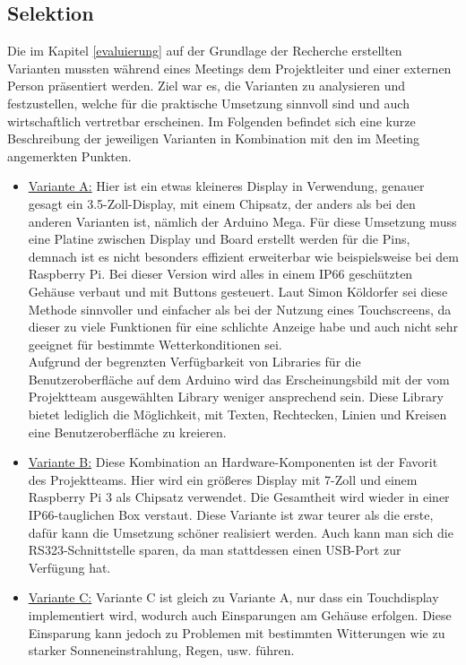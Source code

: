 \newpage
\subsection{Selektion} \label{selektion}
Die im Kapitel \ref{evaluierung} auf der Grundlage der Recherche erstellten Varianten mussten während eines Meetings dem Projektleiter und einer externen Person präsentiert werden. Ziel war es, die Varianten zu analysieren und festzustellen, welche für die praktische Umsetzung sinnvoll sind und auch wirtschaftlich vertretbar erscheinen. Im Folgenden befindet sich eine kurze Beschreibung der jeweiligen Varianten in Kombination mit den im Meeting angemerkten Punkten.

\begin{itemize}
	\item \underline{Variante A:} Hier ist ein etwas kleineres Display in Verwendung, genauer gesagt ein 3.5-Zoll-Display, mit einem Chipsatz, der anders als bei den anderen Varianten ist, nämlich der Arduino Mega. Für diese Umsetzung muss eine Platine zwischen Display und Board erstellt werden für die Pins, demnach ist es nicht besonders effizient erweiterbar wie beispielsweise bei dem Raspberry Pi. Bei dieser Version wird alles in einem IP66 geschützten Gehäuse verbaut und mit Buttons gesteuert. Laut Simon Köldorfer sei diese Methode sinnvoller und einfacher als bei der Nutzung eines Touchscreens, da dieser zu viele Funktionen für eine schlichte Anzeige habe und auch nicht sehr geeignet für bestimmte Wetterkonditionen sei. \\
	Aufgrund der begrenzten Verfügbarkeit von Libraries für die Benutzeroberfläche auf dem Arduino wird das Erscheinungsbild mit der vom Projektteam ausgewählten Library weniger ansprechend sein. Diese Library bietet lediglich die Möglichkeit, mit Texten, Rechtecken, Linien und Kreisen eine Benutzeroberfläche zu kreieren.
	\item \underline{Variante B:} Diese Kombination an Hardware-Komponenten ist der Favorit des Projektteams. Hier wird ein größeres Display mit 7-Zoll und einem Raspberry Pi 3 als Chipsatz verwendet. Die Gesamtheit wird wieder in einer IP66-tauglichen Box verstaut. Diese Variante ist zwar teurer als die erste, dafür kann die Umsetzung schöner realisiert werden. Auch kann man sich die RS323-Schnittstelle sparen, da man stattdessen einen USB-Port zur Verfügung hat.
	\item \underline{Variante C:} Variante C ist gleich zu Variante A, nur dass ein Touchdisplay implementiert wird, wodurch auch Einsparungen am Gehäuse erfolgen. Diese Einsparung kann jedoch zu Problemen mit bestimmten Witterungen wie zu starker Sonneneinstrahlung, Regen, usw. führen. 

\end{itemize}
